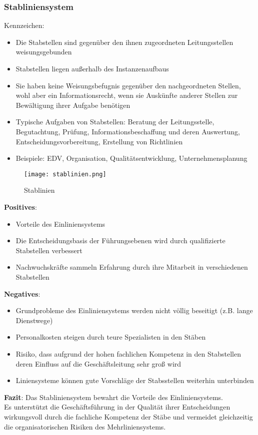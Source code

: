 \documentclass[asp1.tex]{subfiles}
\begin{document}
\subsubsection{Stabliniensystem}
Kennzeichen:
\begin{itemize}
    \item Die Stabstellen sind gegenüber den ihnen zugeordneten Leitungsstellen weisungsgebunden
    \item Stabstellen liegen außerhalb des Instanzenaufbaus
    \item Sie haben keine Weisungsbefugnis gegenüber den nachgeordneten Stellen, wohl aber ein Informationsrecht, wenn sie Auskünfte anderer Stellen zur Bewältigung ihrer Aufgabe benötigen
    \item Typische Aufgaben von Stabstellen: Beratung der Leitungsstelle, Begutachtung, Prüfung, Informationsbeschaffung und deren Auswertung, Entscheidungsvorbereitung, Erstellung von Richtlinien
    \item Beispiele: EDV, Organisation, Qualitätsentwicklung, Unternehmensplanung
\end{itemize}
\begin{figure}[H]
    \begin{center}
        \texttt{[image: stablinien.png]}
    \end{center}
    \caption{Stablinien}
    \label{fig:Stablinien}
\end{figure}
\textbf{Positives}:
\begin{itemize}
    \item Vorteile des Einliniensystems
    \item Die Entscheidungsbasis der Führungsebenen wird durch qualifizierte Stabstellen verbessert
    \item Nachwuchskräfte sammeln Erfahrung durch ihre Mitarbeit in verschiedenen Stabstellen
\end{itemize}
\textbf{Negatives}:
\begin{itemize}
    \item Grundprobleme des Einliniensystems werden nicht völlig beseitigt (z.B. lange Dienstwege)
    \item Personalkosten steigen durch teure Spezialisten in den Stäben
    \item Risiko, dass aufgrund der hohen fachlichen Kompetenz in den Stabstellen deren Einfluss auf die Geschäftsleitung sehr groß wird
    \item Liniensysteme können gute Vorschläge der Stabsstellen weiterhin unterbinden
\end{itemize}
\textbf{Fazit}:
Das Stabliniensystem bewahrt die Vorteile des Einliniensystems. \\
Es unterstützt die Geschäftsführung in der Qualität ihrer Entscheidungen wirkungsvoll durch die fachliche Kompetenz der Stäbe und vermeidet gleichzeitig die organisatorischen Risiken des Mehrliniensystems.
\end{document}
